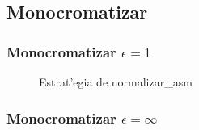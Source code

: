 \subsection{Monocromatizar}
\subsubsection{Monocromatizar $\epsilon = 1$ }

\begin{figure}[hb]
\caption{Estrat'egia de normalizar\_asm}
\label{est:m-uno}
\end{figure}


\subsubsection{Monocromatizar $\epsilon = \infty $ }
